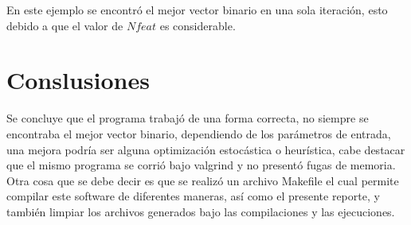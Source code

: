 \documentclass[12pt]{article}
\begin{document}
En este ejemplo se encontró el mejor vector binario en una sola iteración, esto debido a que el valor de $Nfeat$ es considerable.

\section{Conslusiones}
Se concluye que el programa trabajó de una forma correcta, no siempre se encontraba el mejor vector binario, dependiendo de los parámetros de entrada, una mejora podría ser alguna optimización estocástica o heurística, cabe destacar que el mismo programa se corrió bajo valgrind y no presentó fugas de memoria.\\

Otra cosa que se debe decir es que se realizó un archivo Makefile el cual permite compilar este software de diferentes maneras, así como el presente reporte, y también limpiar los archivos generados bajo las compilaciones y las ejecuciones.
\end{document}
